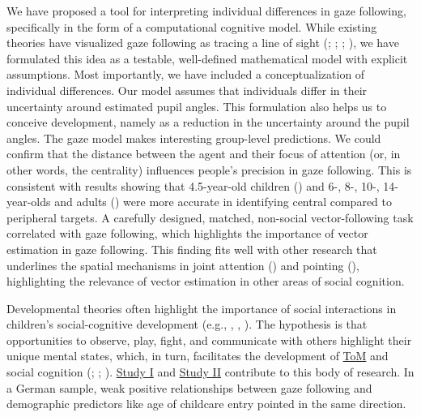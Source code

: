 \documentclass[
]{scrbook}
\begin{document}
We have proposed a tool for interpreting individual differences in gaze following, specifically in the form of a computational cognitive model. While existing theories have visualized gaze following as tracing a line of sight (; ; ; ), we have formulated this idea as a testable, well-defined mathematical model with explicit assumptions. Most importantly, we have included a conceptualization of individual differences. Our model assumes that individuals differ in their uncertainty around estimated pupil angles. This formulation also helps us to conceive development, namely as a reduction in the uncertainty around the pupil angles. The gaze model makes interesting group-level predictions. We could confirm that the distance between the agent and their focus of attention (or, in other words, the centrality) influences people's precision in gaze following. This is consistent with results showing that 4.5-year-old children () and 6-, 8-, 10-, 14-year-olds and adults () were more accurate in identifying central compared to peripheral targets. A carefully designed, matched, non-social vector-following task correlated with gaze following, which highlights the importance of vector estimation in gaze following. This finding fits well with other research that underlines the spatial mechanisms in joint attention () and pointing (), highlighting the relevance of vector estimation in other areas of social cognition.

Developmental theories often highlight the importance of social interactions in children's social-cognitive development (e.g., , , ). The hypothesis is that opportunities to observe, play, fight, and communicate with others highlight their unique mental states, which, in turn, facilitates the development of \hyperref[acronyms_ToM]{ToM} and social cognition (; ; ). \hyperref[studyI]{Study I} and \hyperref[studyII]{Study II} contribute to this body of research. In a German sample, weak positive relationships between gaze following and demographic predictors like age of childcare entry pointed in the same direction.
\end{document}
